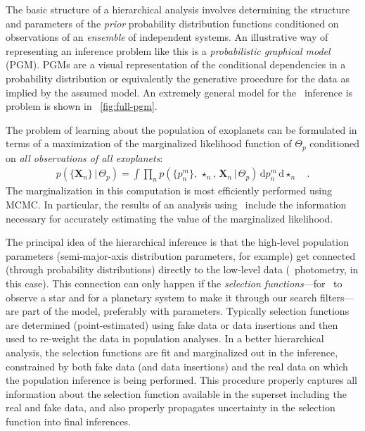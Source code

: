 \documentclass[letterpaper,12pt,preprint]{hack_aastex}
\newcommand{\Bart}{\package{Bart}}
\newcommand{\dd}{\,\mathrm{d}}
\begin{document}
The basic structure of a hierarchical analysis involves determining the
structure and parameters of the \emph{prior} probability distribution
functions conditioned on observations of an \emph{ensemble} of independent
systems.
An illustrative way of representing an inference problem like this is a
\emph{probabilistic graphical model} (PGM).
PGMs are a visual representation of the conditional dependencies in a
probability distribution or equivalently the generative procedure for the data
as implied by the assumed model.
An extremely general model for the \Kepler\ inference is problem is shown in
\figurename~\ref{fig:full-pgm}.

The problem of learning about the population of exoplanets can be formulated
in terms of a maximization of the marginalized likelihood function of
$\Theta_p$ conditioned on \emph{all observations of all exoplanets}:
\begin{eqnarray}
p(\{\mathbf{X}_n\}\,|\,\Theta_p) = \int \prod_{n}
p(\{p_n^m\},\,\star_n,\,\mathbf{X}_n\,|\,\Theta_p)
\dd p_n^m \dd\!\star_n\quad.
\end{eqnarray}
The marginalization in this computation is most efficiently performed using
MCMC.
In particular, the results of an analysis using \Bart\ include the information
necessary for accurately estimating the value of the marginalized likelihood.

The principal idea of the hierarchical inference is that the
high-level population parameters (semi-major-axis distribution
parameters, for example) get connected (through probability
distributions) directly to the low-level data (\Kepler\ photometry, in
this case).
This connection can only happen if the \emph{selection
  functions}---for \Kepler\ to observe a star and for a planetary
system to make it through our search filters---are part of the model,
preferably with parameters.
Typically selection functions are determined (point-estimated) using fake
data or data insertions and then used to re-weight the data in population
analyses.
In a better hierarchical analysis, the selection functions are fit and marginalized
out in the inference, constrained by both fake data (and data insertions) and the
real data on which the population inference is being performed.
This procedure properly captures all information about the selection function
available in the superset including the real and fake data, and also properly
propagates uncertainty in the selection function into final inferences.
\end{document}
